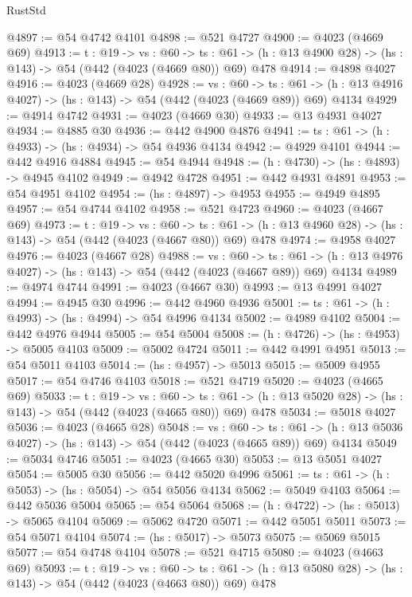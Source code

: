 \begin{lexlean}{RustStd}
\begin{coremodule}
@4897 := @54 @4742 @4101
@4898 := @521 @4727
@4900 := @4023 (@4669 @69)
@4913 := {t : @19} ->
  {vs : @60} ->
  {ts : @61} -> (h : @13 @4900 @28) -> (hs : @143) -> @54 (@442 (@4023 (@4669 @80)) @69) @478
@4914 := @4898 @4027
@4916 := @4023 (@4669 @28)
@4928 := {vs : @60} ->
  {ts : @61} -> (h : @13 @4916 @4027) -> (hs : @143) -> @54 (@442 (@4023 (@4669 @89)) @69) @4134
@4929 := @4914 @4742
@4931 := @4023 (@4669 @30)
@4933 := @13 @4931 @4027
@4934 := @4885 @30
@4936 := @442 @4900 @4876
@4941 := {ts : @61} -> (h : @4933) -> (hs : @4934) -> @54 @4936 @4134
@4942 := @4929 @4101
@4944 := @442 @4916 @4884
@4945 := @54 @4944
@4948 := (h : @4730) -> (hs : @4893) -> @4945 @4102
@4949 := @4942 @4728
@4951 := @442 @4931 @4891
@4953 := @54 @4951 @4102
@4954 := (hs : @4897) -> @4953
@4955 := @4949 @4895
@4957 := @54 @4744 @4102
@4958 := @521 @4723
@4960 := @4023 (@4667 @69)
@4973 := {t : @19} ->
  {vs : @60} ->
  {ts : @61} -> (h : @13 @4960 @28) -> (hs : @143) -> @54 (@442 (@4023 (@4667 @80)) @69) @478
@4974 := @4958 @4027
@4976 := @4023 (@4667 @28)
@4988 := {vs : @60} ->
  {ts : @61} -> (h : @13 @4976 @4027) -> (hs : @143) -> @54 (@442 (@4023 (@4667 @89)) @69) @4134
@4989 := @4974 @4744
@4991 := @4023 (@4667 @30)
@4993 := @13 @4991 @4027
@4994 := @4945 @30
@4996 := @442 @4960 @4936
@5001 := {ts : @61} -> (h : @4993) -> (hs : @4994) -> @54 @4996 @4134
@5002 := @4989 @4102
@5004 := @442 @4976 @4944
@5005 := @54 @5004
@5008 := (h : @4726) -> (hs : @4953) -> @5005 @4103
@5009 := @5002 @4724
@5011 := @442 @4991 @4951
@5013 := @54 @5011 @4103
@5014 := (hs : @4957) -> @5013
@5015 := @5009 @4955
@5017 := @54 @4746 @4103
@5018 := @521 @4719
@5020 := @4023 (@4665 @69)
@5033 := {t : @19} ->
  {vs : @60} ->
  {ts : @61} -> (h : @13 @5020 @28) -> (hs : @143) -> @54 (@442 (@4023 (@4665 @80)) @69) @478
@5034 := @5018 @4027
@5036 := @4023 (@4665 @28)
@5048 := {vs : @60} ->
  {ts : @61} -> (h : @13 @5036 @4027) -> (hs : @143) -> @54 (@442 (@4023 (@4665 @89)) @69) @4134
@5049 := @5034 @4746
@5051 := @4023 (@4665 @30)
@5053 := @13 @5051 @4027
@5054 := @5005 @30
@5056 := @442 @5020 @4996
@5061 := {ts : @61} -> (h : @5053) -> (hs : @5054) -> @54 @5056 @4134
@5062 := @5049 @4103
@5064 := @442 @5036 @5004
@5065 := @54 @5064
@5068 := (h : @4722) -> (hs : @5013) -> @5065 @4104
@5069 := @5062 @4720
@5071 := @442 @5051 @5011
@5073 := @54 @5071 @4104
@5074 := (hs : @5017) -> @5073
@5075 := @5069 @5015
@5077 := @54 @4748 @4104
@5078 := @521 @4715
@5080 := @4023 (@4663 @69)
@5093 := {t : @19} ->
  {vs : @60} ->
  {ts : @61} -> (h : @13 @5080 @28) -> (hs : @143) -> @54 (@442 (@4023 (@4663 @80)) @69) @478

\end{coremodule}
\end{lexlean}
